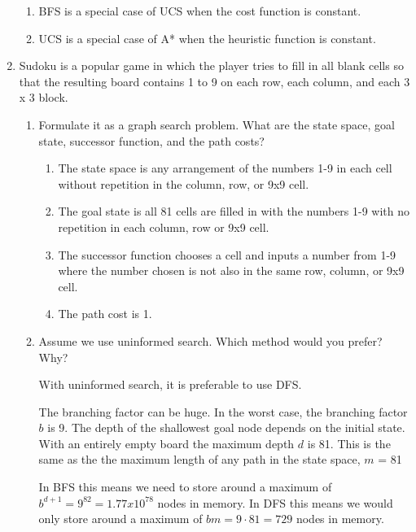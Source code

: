 \documentclass[12pt,letterpaper]{article}
\begin{document}
\begin{enumerate}
      \begin{enumerate}
        \item BFS is a special case of UCS when the cost function is constant.
        \item UCS is a special case of A* when the heuristic function is constant.
      \end{enumerate}
    \item
      Sudoku is a popular game in which the player tries to fill in all blank cells
      so that the resulting board contains 1 to 9 on each
      row, each column, and each 3 x 3 block.

      \begin{enumerate}
        \item
          Formulate it as a graph search problem.
          What are the state space, goal state, successor function, and the path costs?
          \begin{enumerate}
            \item
              The state space is any arrangement of the numbers 1-9 in each cell
              without repetition in the column, row, or 9x9 cell.
            \item
              The goal state is all 81 cells are filled in with
              the numbers 1-9 with no repetition in each column, row or 9x9 cell.
            \item
              The successor function chooses a cell and inputs a number from 1-9
              where the number chosen is not also in the same row, column, or 9x9 cell.
            \item
              The path cost is 1.
          \end{enumerate}
        \item
          Assume we use uninformed search.
          Which method would you prefer? Why?

          With uninformed search, it is preferable to use DFS.

          The branching factor can be huge.
          In the worst case, the branching factor $b$ is 9.
          The depth of the shallowest goal node depends on the initial state.
          With an entirely empty board the maximum depth $d$ is 81.
          This is the same as the the maximum length of any path in the state space,
          $m$ = 81

          In BFS this means we need to store around a maximum of $b^{d+1} = 9^82 = 1.77 x 10^78$ nodes in memory.
          In DFS this means we would only store around a maximum of $bm = 9 \cdot 81 = 729$ nodes in memory.


\end{enumerate}
\end{enumerate}
\end{document}
